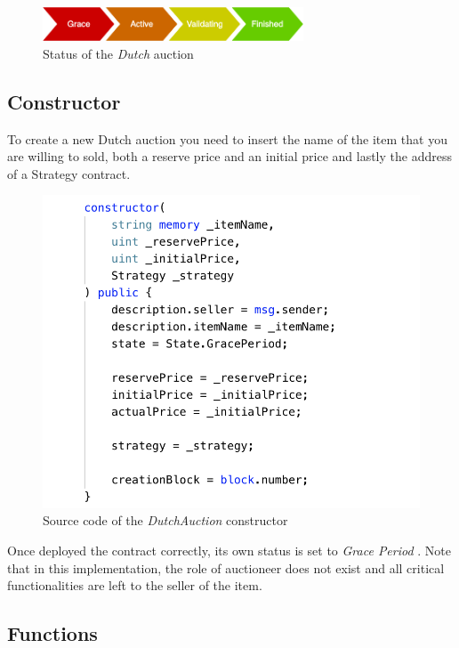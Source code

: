 \documentclass[runningheads,a4paper]{llncs}
\begin{document}
\begin{figure}[h]
\includegraphics[width=220pt]{images/dutchStatus.png}
\centering
\caption{Status of the \emph{Dutch} auction}
\label{fig:dutchStatus}
\end{figure}


\subsection{Constructor}
To create a new Dutch auction you need to insert the name of the item that you are willing to sold, both a reserve price and an initial price and lastly the address of a Strategy contract.

\begin{figure}[h]
\includegraphics[width=0.6\linewidth]{images/DutchConstructor.png}
\centering
\caption{Source code of the \emph{DutchAuction} constructor}
\label{fig:dutchConstructor}
\end{figure}

Once deployed the contract correctly, its own status is set to \emph{Grace Period} . Note that in this implementation, the role of auctioneer does not exist and all critical functionalities are left to the seller of the item.

\newpage
\subsection{Functions}
\end{document}
